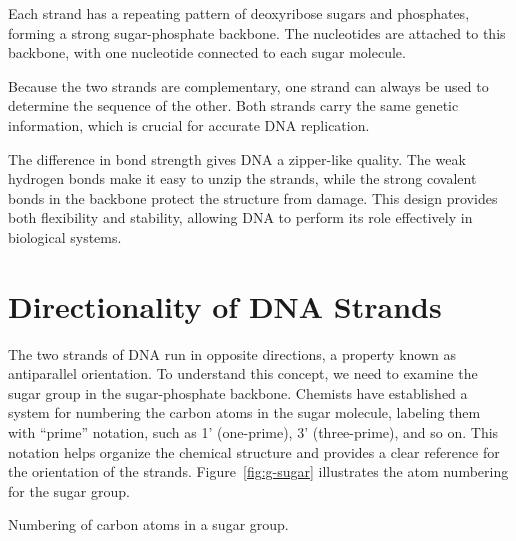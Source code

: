   Each strand has a repeating pattern of deoxyribose sugars and phosphates, forming a strong sugar-phosphate backbone. The nucleotides are attached to this backbone, with one nucleotide connected to each sugar molecule.

Because the two strands are complementary, one strand can always be used to determine the sequence of the other. Both strands carry the same genetic information, which is crucial for accurate DNA replication.

The difference in bond strength gives DNA a zipper-like quality. The weak hydrogen bonds make it easy to unzip the strands, while the strong covalent bonds in the backbone protect the structure from damage. This design provides both flexibility and stability, allowing DNA to perform its role effectively in biological systems.

\section{Directionality of DNA Strands}

The two strands of DNA run in opposite directions, a property known as antiparallel orientation. To understand this concept, we need to examine the sugar group in the sugar-phosphate backbone. Chemists have established a system for numbering the carbon atoms in the sugar molecule, labeling them with ``prime'' notation, such as 1' (one-prime), 3' (three-prime), and so on. This notation helps organize the chemical structure and provides a clear reference for the orientation of the strands. Figure~\ref{fig:g-sugar} illustrates the atom numbering for the sugar group.

\begin{marginfigure}
  \caption[6pt]{Numbering of carbon atoms in a sugar group.}
  \label{fig:g-sugar}
\end{marginfigure}

